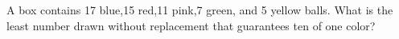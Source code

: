A box contains 17 blue,15 red,11 pink,7 green, and 5 yellow balls. What is the least number drawn without replacement that guarantees ten of one color?
